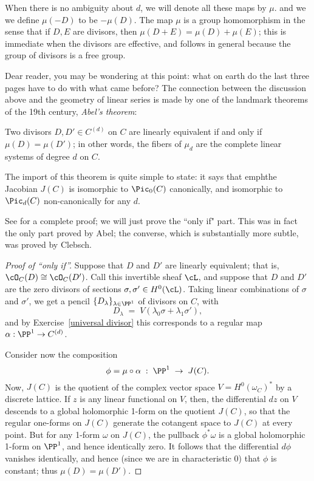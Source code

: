 When there is no ambiguity about $d$, we will denote all these maps  by $\mu$.  and we 
we define $\mu(-D)$ to be $-\mu(D)$. 
The map $\mu$ is a group homomorphism in the sense that if $D, E$ are divisors, then
$\mu (D+E) = \mu(D) + \mu(E)$; this is immediate when the divisors are effective, and 
follows in general because the group of divisors is a free group.

Dear reader, you may be wondering at this point: what on earth do the last three pages have to do with what came before? The connection between the discussion above and the geometry of linear series is made by one of the landmark theorems of the 19th century, \emph{Abel's theorem}:

\begin{theorem}
Two divisors $D, D' \in C^{(d)}$ on $C$ are linearly equivalent if and only if $\mu(D) = \mu(D')$; in other words, the fibers of $\mu_d$ are the complete linear systems of degree $d$ on $C$.
\end{theorem}

The import of this theorem is quite simple to state: it says that emph{the Jacobian $J(C)$ is isomorphic to $\Pic_0(C)$} canonically, and isomorphic to $\Pic_d(C)$ non-canonically for any $d$.

See \cite[Section 2.2]{GH}  for a complete proof; we will just prove the ``only if" part. This was in fact the only part proved by Abel; the converse, which is substantially more subtle, was proved by Clebsch.

\begin{proof}[Proof of ``only if'']
Suppose that $D$ and $D'$ are linearly equivalent; that is, $\cO_C(D) \cong \cO_C(D')$. Call this invertible sheaf $\cL$, and suppose that $D$ and $D'$ are the zero divisors of sections $\sigma, \sigma' \in H^0(\cL)$.
Taking linear combinations of $\sigma$ and $\sigma'$, we get a pencil $\{D_\lambda\}_{\lambda \in \PP^1}$ of divisors on $C$, with
$$
D_\lambda \; = \; V(\lambda_0\sigma + \lambda_1\sigma'),
$$
and by Exercise~\ref{universal divisor} this corresponds to a regular map $\alpha : \PP^1 \to C^{(d)}$. 

Consider now the composition
$$
\phi = \mu \circ \alpha \; : \; \PP^1 \; \to \; J(C).
$$
Now, $J(C)$ is the quotient of the complex vector space $V = H^0(\omega_C)^*$ by a discrete lattice. If $z$ is any linear functional on $V$, then, the differential $dz$  on $V$ descends to a global holomorphic 1-form on the quotient $J(C)$, so that the regular one-forms on $J(C)$ generate the cotangent space to $J(C)$ at every point. But for any 1-form $\omega$ on $J(C)$, the pullback $\phi^*\omega$ is a global holomorphic 1-form on $\PP^1$, and hence identically zero. It follows that the differential $d\phi$ vanishes identically, and hence (since we are in characteristic 0) that $\phi$ is constant; thus $\mu(D) = \mu(D')$.
\end{proof}

